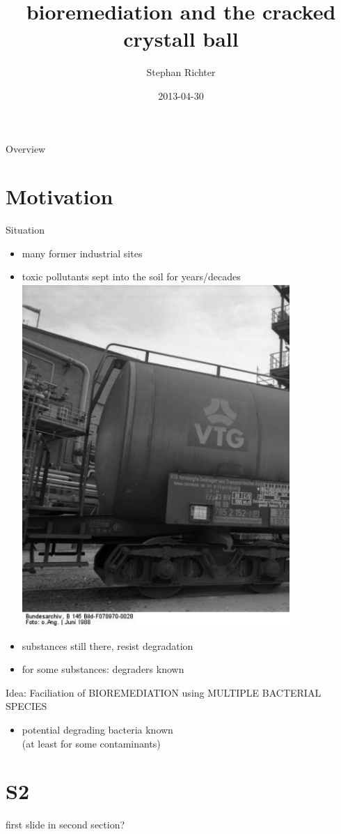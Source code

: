 \documentclass[style=aggie]{powerdot}
\title{bioremediation and the cracked crystall ball}
\author{Stephan Richter}
\date{2013-04-30}
\begin{document}
\maketitle

\begin{slide}{Overview}
\tableofcontents[content=sections]
\end{slide}

\section{Motivation}
\begin{slide}{Situation}
\begin{itemize}
 \item many former industrial sites
 \item toxic pollutants sept into the soil for years/decades
 \includegraphics[width=0.8\textwidth]{waggon.ps}
 \item substances still there, resist degradation
 \item for some substances: degraders known
\end{itemize}
\end{slide}

\begin{slide}{Idea: Faciliation of BIOREMEDIATION using MULTIPLE BACTERIAL SPECIES}
\begin{itemize}
 \item potential degrading bacteria known\\ (at least for some contaminants)
\end{itemize}

\end{slide}
\section{S2}

\begin{slide}{}
first slide in second section?
\end{slide}
\end{document}
